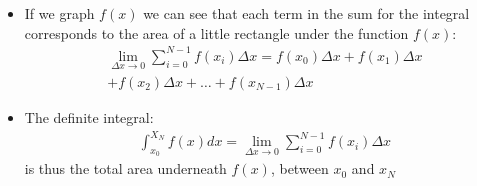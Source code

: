 \documentclass[aspectratio=169,
hyperref={colorlinks,urlcolor=blue}
]{beamer}
\begin{document}
{
\scriptsize
\begin{itemize}
\item If we graph $f(x)$ we can see that each term in the sum for the integral corresponds to the area of a little rectangle under the function $f(x)$:
\begin{align*}
\lim_{\Delta x \to 0}\sum_{i=0}^{N-1}f(x_i)\Delta x = f(x_0)\Delta x + f(x_1)\Delta x\\
+ f(x_2)\Delta x+\dots + f(x_{N-1})\Delta x
\end{align*}
\item The definite integral:
\begin{align*}
\int_{x_0}^{X_N}f(x) dx=\lim_{\Delta x \to 0}\sum_{i=0}^{N-1}f(x_i)\Delta x 
\end{align*}
is thus the total area underneath $f(x)$, between $x_0$ and $x_N$  
\end{itemize}

}
\end{document}

